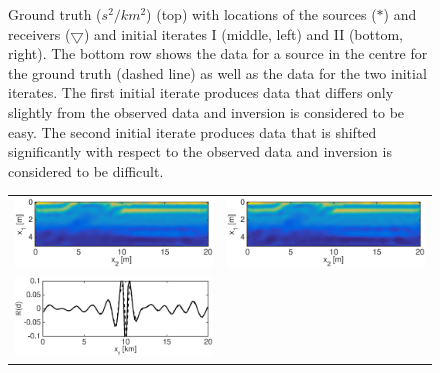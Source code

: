 \documentclass{iopart}
\begin{document}
\begin{figure}
\begin{tabular}{cc}
\end{tabular}
\caption{Ground truth ($s^2/km^2$) (top) with locations of the sources ($*$) and receivers ($\bigtriangledown$) and initial iterates I (middle, left) and II (bottom, right). The bottom row shows the data for a source in the centre for the ground truth (dashed line) as well as the data for the two initial iterates. The first initial iterate produces data that differs only slightly from the observed data and inversion is considered to be easy. The second initial iterate produces data that is shifted significantly with respect to the observed data and inversion is considered to be difficult.}
\label{fig:overthrust_model}
\end{figure}

\begin{figure}
\centering
\begin{tabular}{cc}
\includegraphics[scale=.3]{./figs/2D_overthrust1_g}&
\includegraphics[scale=.3]{./figs/2D_overthrust1_h}\\
\includegraphics[scale=.3]{./figs/2D_overthrust1_l}&

\end{tabular}
\end{figure}
\end{document}
